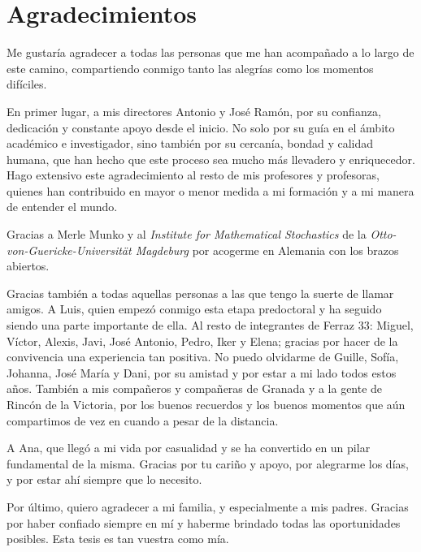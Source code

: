 
\begingroup
\let\clearpage\relax
\let\cleardoublepage\relax
\let\cleardoublepage\relax
\chapter*{Agradecimientos}

Me gustaría agradecer a todas las personas que me han acompañado a lo largo de este camino, compartiendo conmigo tanto las alegrías como los momentos difíciles.

En primer lugar, a mis directores Antonio y José Ramón, por su confianza, dedicación y constante apoyo desde el inicio. No solo por su guía en el ámbito académico e investigador, sino también por su cercanía, bondad y calidad humana, que han hecho que este proceso sea mucho más llevadero y enriquecedor. Hago extensivo este agradecimiento al resto de mis profesores y profesoras, quienes han contribuido en mayor o menor medida a mi formación y a mi manera de entender el mundo.

Gracias a Merle Munko y al \textit{Institute for Mathematical Stochastics} de la \textit{Otto-von-Guericke-Universität Magdeburg} por acogerme en Alemania con los brazos abiertos.

Gracias también a todas aquellas personas a las que tengo la suerte de llamar amigos. A Luis, quien empezó conmigo esta etapa predoctoral y ha seguido siendo una parte importante de ella. Al resto de integrantes de Ferraz 33: Miguel, Víctor, Alexis, Javi, José Antonio, Pedro, Iker y Elena; gracias por hacer de la convivencia una experiencia tan positiva. No puedo olvidarme de Guille, Sofía, Johanna, José María y Dani, por su amistad y por estar a mi lado todos estos años. También a mis compañeros y compañeras de Granada y a la gente de Rincón de la Victoria, por los buenos recuerdos y los buenos momentos que aún compartimos de vez en cuando a pesar de la distancia.

A Ana, que llegó a mi vida por casualidad y se ha convertido en un pilar fundamental de la misma. Gracias por tu cariño y apoyo, por alegrarme los días, y por estar ahí siempre que lo necesito.

Por último, quiero agradecer a mi familia, y especialmente a mis padres. Gracias por haber confiado siempre en mí y haberme brindado todas las oportunidades posibles. Esta tesis es tan vuestra como mía.

\endgroup
